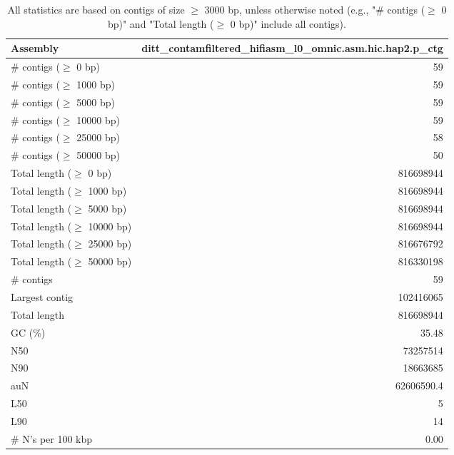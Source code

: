 \documentclass[12pt,a4paper]{article}
\begin{document}
\begin{table}[ht]
\begin{center}
\caption{All statistics are based on contigs of size $\geq$ 3000 bp, unless otherwise noted (e.g., "\# contigs ($\geq$ 0 bp)" and "Total length ($\geq$ 0 bp)" include all contigs).}
\begin{tabular}{|l*{1}{|r}|}
\hline
Assembly & ditt\_contamfiltered\_hifiasm\_l0\_omnic.asm.hic.hap2.p\_ctg \\ \hline
\# contigs ($\geq$ 0 bp) & 59 \\ \hline
\# contigs ($\geq$ 1000 bp) & 59 \\ \hline
\# contigs ($\geq$ 5000 bp) & 59 \\ \hline
\# contigs ($\geq$ 10000 bp) & 59 \\ \hline
\# contigs ($\geq$ 25000 bp) & 58 \\ \hline
\# contigs ($\geq$ 50000 bp) & 50 \\ \hline
Total length ($\geq$ 0 bp) & 816698944 \\ \hline
Total length ($\geq$ 1000 bp) & 816698944 \\ \hline
Total length ($\geq$ 5000 bp) & 816698944 \\ \hline
Total length ($\geq$ 10000 bp) & 816698944 \\ \hline
Total length ($\geq$ 25000 bp) & 816676792 \\ \hline
Total length ($\geq$ 50000 bp) & 816330198 \\ \hline
\# contigs & 59 \\ \hline
Largest contig & 102416065 \\ \hline
Total length & 816698944 \\ \hline
GC (\%) & 35.48 \\ \hline
N50 & 73257514 \\ \hline
N90 & 18663685 \\ \hline
auN & 62606590.4 \\ \hline
L50 & 5 \\ \hline
L90 & 14 \\ \hline
\# N's per 100 kbp & 0.00 \\ \hline
\end{tabular}
\end{center}
\end{table}
\end{document}
